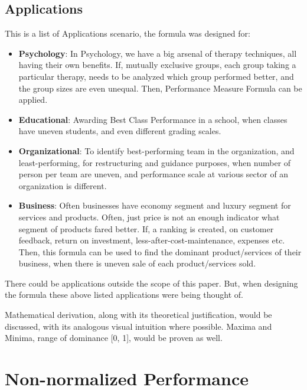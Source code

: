 \documentclass[man,floatsintext]{apa7}
\begin{document}
\subsection{Applications}
This is a list of Applications scenario, the formula was designed for:
\begin{itemize}
	\item \textbf{Psychology}: In Psychology, we have a big arsenal of therapy techniques, all having their own benefits. If, mutually exclusive groups, each group taking a particular therapy, needs to be analyzed which group performed better, and the group sizes are even unequal. Then, Performance Measure Formula can be applied.
    \item \textbf{Educational}: Awarding Best Class Performance in a school, when classes have uneven students, and even different grading scales.
    \item \textbf{Organizational}: To identify best-performing team in the organization, and least-performing, for restructuring and guidance purposes, when number of person per team are uneven, and performance scale at various sector of an organization is different.
   \item \textbf{Business}: Often businesses have economy segment and luxury segment for services and products. Often, just price is not an enough indicator what segment of products fared better. If, a ranking is created, on customer feedback, return on investment, less-after-cost-maintenance, expenses etc. Then, this formula can be used to find the dominant product/services of their business, when there is uneven sale of each product/services sold.
\end{itemize}
There could be applications outside the scope of this paper. But, when designing the formula these above listed applications were being thought of.

\hfill \break
Mathematical derivation, along with its theoretical justification, would be discussed, with its analogous visual intuition where possible. Maxima and Minima, range of dominance [0, 1], would be proven as well.

\section{Non-normalized Performance}
\end{document}
